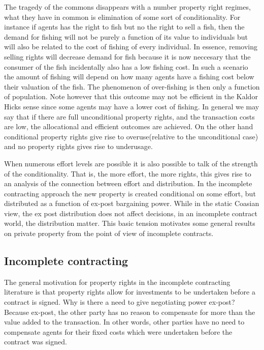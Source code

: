 \documentclass[12pt]{article}
\numberwithin{equation}{section}
\begin{document}

The tragedy of the commons disappears with a number property right regimes, what they have in common is elimination of some sort of conditionality. For instance if agents has the right to fish but no the right to sell a fish, then the demand for fishing will not be purely a function of its value to individuals but will also be related to the cost of fishing of every individual. In essence, removing selling rights will decrease demand for fish because it is now neccesary that the consumer of the fish incidentally also has a low fishing cost. In such a scenario the amount of fishing will depend on how many agents have a fishing cost below their valuation of the fish. The phenomenon of over-fishing is then only a function of population. Note however that this outcome may not be efficient in the Kaldor Hicks sense since some agents may have a lower cost of fishing.  In general we may say that if there are full unconditional property rights, and the transaction costs are low, the allocational and efficient outcomes are achieved. On the other hand conditional property rights give rise to overuse(relative to the unconditional case) and no property rights gives rise to underusage.

When numerous effort levels are possible it is also possible to talk of the strength of the conditionality. That is, the more effort, the more rights, this gives rise to an analysis of the connection between effort and distribution. In the incomplete contracting approach the new property is created conditional on some effort, but distributed as a function of ex-post bargaining power. While in the static Coasian view, the ex post distribution does not affect decisions, in an incomplete contract world, the distribution matter. This basic tension motivates some general results on private property from the point of view of incomplete contracts.

\subsection{Incomplete contracting}

The general motivation for property rights in the incomplete contracting literature is that property rights allow for investments to be undertaken before a contract is signed. Why is there a need to give negotiating power ex-post? Because ex-post, the other party has no reason to compensate for more than the value added to the transaction. In other words, other parties have no need to compensate agents for their fixed costs which were undertaken before the contract was signed.
\end{document}
